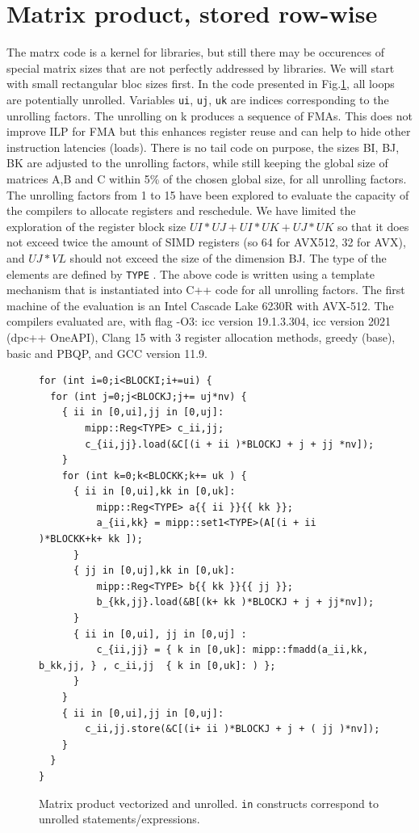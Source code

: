 \documentclass[sigconf,review]{acmart}
\begin{document}
\section{Matrix product, stored row-wise}
The matrx code is a kernel for libraries, but still there may be occurences of special matrix sizes that are not perfectly addressed by libraries. We will start with small rectangular bloc sizes first. In the code presented in Fig.\ref{fig:gemm}, all loops are potentially unrolled. Variables \texttt{ui}, \texttt{uj}, \texttt{uk}
are indices corresponding to the unrolling factors. The unrolling on k
produces a sequence of FMAs. This does not improve ILP for FMA but
this enhances register reuse and can help to hide other instruction
latencies (loads).  There is no tail code on purpose, the sizes BI,
BJ, BK are adjusted to the unrolling factors, while still keeping the
global size of matrices A,B and C within 5\% of the chosen global
size, for all unrolling factors.  The unrolling factors from 1 to 15
have been explored to evaluate the capacity of the compilers to
allocate registers and reschedule. We have limited the exploration of
the register block size $UI*UJ+UI*UK+UJ*UK$ so that it does not exceed
twice the amount of SIMD registers (so 64 for AVX512, 32 for AVX), and
$UJ*VL$ should not exceed the size of the dimension BJ.  The type of the elements are defined by \texttt{TYPE} . The above code
is written using a template mechanism that is instantiated
into C++ code for all unrolling factors.  The first machine of the
evaluation is an Intel Cascade Lake 6230R with AVX-512. The compilers
evaluated are, with flag -O3: icc version 19.1.3.304, icc version 2021
(dpc++ OneAPI), Clang 15 with 3 register allocation methods, greedy
(base), basic and PBQP, and GCC version 11.9.


\begin{figure}
  \begin{lstlisting}
for (int i=0;i<BLOCKI;i+=ui) {                
  for (int j=0;j<BLOCKJ;j+= uj*nv) {           
    { ii in [0,ui],jj in [0,uj]:
        mipp::Reg<TYPE> c_ii,jj;
        c_{ii,jj}.load(&C[(i + ii )*BLOCKJ + j + jj *nv]);
    }                
    for (int k=0;k<BLOCKK;k+= uk ) {            
      { ii in [0,ui],kk in [0,uk]:
          mipp::Reg<TYPE> a{{ ii }}{{ kk }};
          a_{ii,kk} = mipp::set1<TYPE>(A[(i + ii )*BLOCKK+k+ kk ]);
      }
      { jj in [0,uj],kk in [0,uk]:
          mipp::Reg<TYPE> b{{ kk }}{{ jj }};
          b_{kk,jj}.load(&B[(k+ kk )*BLOCKJ + j + jj*nv]);
      }    
      { ii in [0,ui], jj in [0,uj] :
          c_{ii,jj} = { k in [0,uk]: mipp::fmadd(a_ii,kk, b_kk,jj, } , c_ii,jj  { k in [0,uk]: ) };
      }
    }
    { ii in [0,ui],jj in [0,uj]:
        c_ii,jj.store(&C[(i+ ii )*BLOCKJ + j + ( jj )*nv]);      
    }
  }
}
  \end{lstlisting}
  \caption{Matrix product vectorized and unrolled\label{fig:gemm}. \texttt{in} constructs correspond to unrolled statements/expressions. }
\end{figure}
\end{document}
